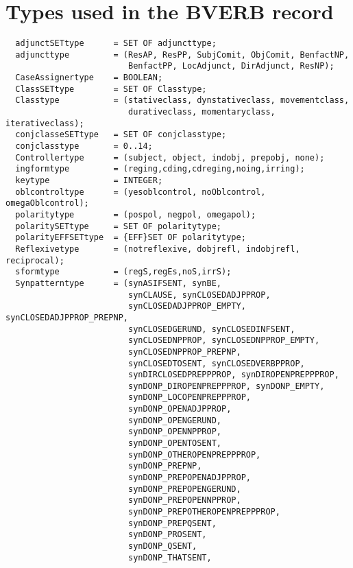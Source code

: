 \section{Types used in the BVERB record}
\begin{verbatim}
  adjunctSETtype      = SET OF adjuncttype;
  adjuncttype         = (ResAP, ResPP, SubjComit, ObjComit, BenfactNP,
                         BenfactPP, LocAdjunct, DirAdjunct, ResNP);
  CaseAssignertype    = BOOLEAN;
  ClassSETtype        = SET OF Classtype;
  Classtype           = (stativeclass, dynstativeclass, movementclass, 
                         durativeclass, momentaryclass, iterativeclass);
  conjclasseSETtype   = SET OF conjclasstype; 
  conjclasstype       = 0..14;
  Controllertype      = (subject, object, indobj, prepobj, none);
  ingformtype         = (reging,cding,cdreging,noing,irring);
  keytype             = INTEGER;
  oblcontroltype      = (yesoblcontrol, noOblcontrol, omegaOblcontrol);
  polaritytype        = (pospol, negpol, omegapol);
  polaritySETtype     = SET OF polaritytype;       
  polarityEFFSETtype  = {EFF}SET OF polaritytype;        
  Reflexivetype       = (notreflexive, dobjrefl, indobjrefl, reciprocal);
  sformtype           = (regS,regEs,noS,irrS);
  Synpatterntype      = (synASIFSENT, synBE, 
                         synCLAUSE, synCLOSEDADJPPROP, 
                         synCLOSEDADJPPROP_EMPTY, synCLOSEDADJPPROP_PREPNP, 
                         synCLOSEDGERUND, synCLOSEDINFSENT, 
                         synCLOSEDNPPROP, synCLOSEDNPPROP_EMPTY, 
                         synCLOSEDNPPROP_PREPNP,               
                         synCLOSEDTOSENT, synCLOSEDVERBPPROP,
                         synDIRCLOSEDPREPPPROP, synDIROPENPREPPPROP,
                         synDONP_DIROPENPREPPPROP, synDONP_EMPTY,
                         synDONP_LOCOPENPREPPPROP, 
                         synDONP_OPENADJPPROP, 
                         synDONP_OPENGERUND,   
                         synDONP_OPENNPPROP, 
                         synDONP_OPENTOSENT, 
                         synDONP_OTHEROPENPREPPPROP,       
                         synDONP_PREPNP, 
                         synDONP_PREPOPENADJPPROP,         
                         synDONP_PREPOPENGERUND,           
                         synDONP_PREPOPENNPPROP, 
                         synDONP_PREPOTHEROPENPREPPPROP,   
                         synDONP_PREPQSENT,                
                         synDONP_PROSENT,                  
                         synDONP_QSENT,                    
                         synDONP_THATSENT,                 

\end{verbatim}
